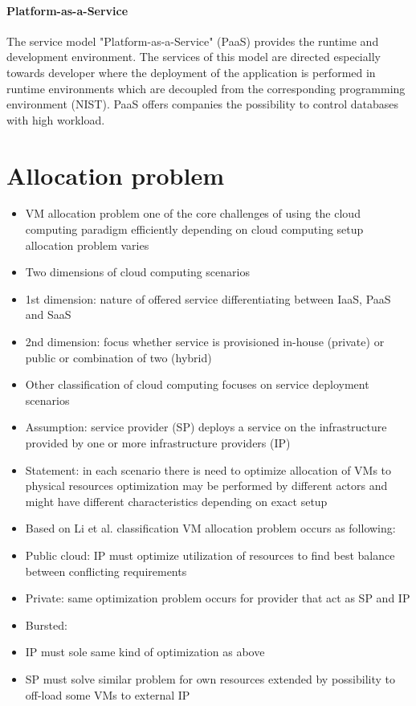 \paragraph{Platform-as-a-Service}
The service model "Platform-as-a-Service" (PaaS) provides the runtime and development environment. The services of this model are directed especially
towards developer where the deployment of the application is performed in runtime environments which are decoupled from the corresponding programming
environment (NIST). PaaS offers companies the possibility to control databases with
high workload.
%
%
%
\section{Allocation problem}
\begin{itemize}
	\item VM allocation problem one of the core challenges of using the cloud computing paradigm efficiently
 depending on cloud computing setup allocation problem varies
 	\item Two dimensions of cloud computing scenarios
	\item 1st dimension: nature of offered service differentiating between IaaS, PaaS and SaaS
	\item 2nd dimension: focus whether service is provisioned in-house (private) or public or combination of two (hybrid)
	\item Other classification of cloud computing focuses on service deployment scenarios
	\item Assumption: service provider (SP) deploys a service on the infrastructure provided by one or more infrastructure providers (IP)
 	\item Statement: in each scenario there is need to optimize allocation of VMs to physical resources
 optimization may be performed by different actors and might have different characteristics depending on exact setup
 	\item Based on Li et al. classification VM allocation problem occurs as following:
 	\item Public cloud: IP must optimize utilization of resources to find best balance between conflicting requirements
 	\item Private: same optimization problem occurs for provider that act as SP and IP
 	\item Bursted:
 	\item IP must sole same kind of optimization as above
 	\item SP must solve similar problem for own resources extended by possibility to off-load some VMs to external IP

\end{itemize}
